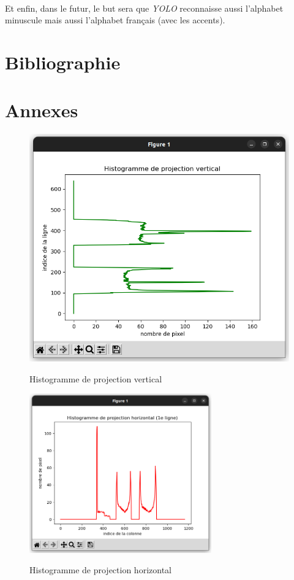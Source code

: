 \documentclass[a4paper]{article}
\begin{document}
		\paragraph{}
			Et enfin, dans le futur, le but sera que \emph{YOLO} reconnaisse aussi l'alphabet minuscule mais aussi l'alphabet français (avec les accents).
	\newpage
	\section*{Bibliographie}
	\newpage
	\section*{Annexes}
		\begin{figure}[H]
			\caption{Histogramme de projection vertical}
			\includegraphics[width=.7\textwidth]{histoY.png}
			\centering
			\label{fig:histoY}
		\end{figure}
		\begin{figure}[H]
			\caption{Histogramme de projection horizontal}
			\includegraphics[width=0.7\textwidth]{histoX1.png}
			\centering
			\label{fig:histoX1}
		\end{figure}
\end{document}
